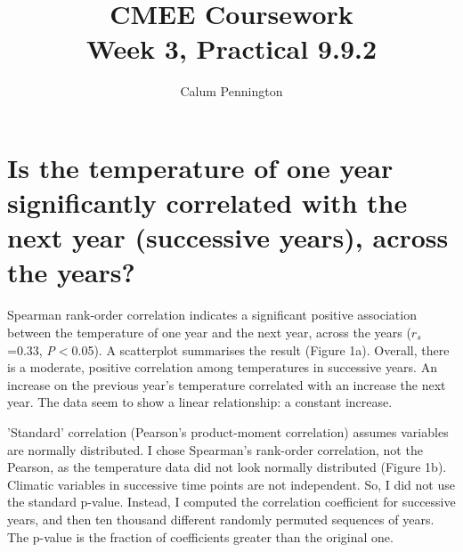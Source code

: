 \documentclass[11pt]{article}
\title{\textbf{CMEE Coursework\\Week 3, Practical 9.9.2}}
\author{Calum Pennington}
\date{}
\begin{document}
\maketitle

\section*{Is the temperature of one year significantly correlated with the next year (successive years), across the years?}
Spearman rank-order correlation indicates a significant positive association between the temperature of one year and the next year, across the years (\emph{$r_s$}=0.33, \emph{P}$<$0.05). A scatterplot summarises the result (Figure 1a). Overall, there is a moderate, positive correlation among temperatures in successive years. An increase on the previous year's temperature correlated with an increase the next year. The data seem to show a linear relationship: a constant increase.

'Standard' correlation (Pearson's product-moment correlation) assumes variables are normally distributed. I chose Spearman's rank-order correlation, not the Pearson, as the temperature data did not look normally distributed (Figure 1b). Climatic variables in successive time points are not independent. So, I did not use the standard p-value. Instead, I computed the correlation coefficient for successive years, and then ten thousand different randomly permuted sequences of years. The p-value is the fraction of coefficients greater than the original one.
\end{document}
